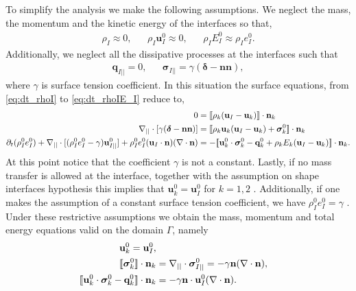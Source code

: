 To simplify the analysis we make the following assumptions. We neglect the mass, the momentum and the kinetic energy of the interfaces so that,
\begin{align*}
    \rho_I \approx 0,
    &&
    \rho_I \textbf{u}_I^0 \approx 0,
    &&
    \rho_I E_I^0 \approx \rho_I e_I^0. 
\end{align*}
Additionally, we neglect all the dissipative processes at the interfaces such that
\begin{align*}
    \textbf{q}_{I||} = 0,
    &&
    \bm\sigma_{I||} = \gamma (\bm\delta  - \textbf{nn}),
\end{align*}
where $\gamma$ is surface tension coefficient. 
In this situation the surface equations, from \ref{eq:dt_rhoI} to \ref{eq:dt_rhoIE_I} reduce to, 
\begin{align}
    0&= 
    \llbracket 
        \rho_k (\textbf{u}_I - \textbf{u}_k)
     \rrbracket \cdot \textbf{n}_k
    \\
    \mathbf{\nabla}_{||}\cdot [\gamma ( \bm\delta - \textbf{nn})]
    &= 
    \llbracket 
        \rho_k \textbf{u}_k (\textbf{u}_I - \textbf{u}_k)
        + \bm\sigma^0_k
     \rrbracket \cdot \textbf{n}_k
    \\
    \partial_t (\rho_I^0e_I^0)  
    + \mathbf{\nabla}_{||}\cdot [
        (\rho_I^0 e_I^0 - \gamma)
         \textbf{u}_{I||}^0
        ]
    + \rho_I^0e_I^0  (\textbf{u}_I \cdot \textbf{n})(\mathbf{\nabla}\cdot \textbf{n})
    &= 
    -\llbracket \textbf{u}_k^0 \cdot \bm{\sigma}_k^0 - \textbf{q}_k^0
    + \rho_k E_k (\textbf{u}_I - \textbf{u}_k)
     \rrbracket \cdot \textbf{n}_k. 
\end{align} 
At this point notice that the coefficient $\gamma$ is not a constant. 
Lastly, if no mass transfer is allowed at the interface, together with the assumption on shape interfaces hypothesis this implies that $\textbf{u}_k^0 = \textbf{u}_I^0$ for $k = 1,2$ \citep[chapter 2]{tryggvason2011direct}. 
Additionally, if one makes the assumption of a constant surface tension coefficient, we have $\rho_I^0 e_I^0 = \gamma$ \citep{ishii2010thermo}.  
Under these restrictive assumptions we obtain the mass, momentum and total energy equations valid on the domain $\Gamma$, namely
\begin{align}
    \label{eq:dt_rho_I}
    \textbf{u}_k^0 = \textbf{u}_I^0, \\
    \llbracket \bm{\sigma}_k^0 \rrbracket \cdot \textbf{n}_k 
    &=
    \mathbf{\nabla}_{||}\cdot\bm\sigma^0_{I||}
    =
    -\gamma\textbf{n}(\mathbf{\nabla}\cdot \textbf{n}),
    \label{eq:surface_tension}\\
    \label{eq:dt_rhoI_EI}
    \llbracket \textbf{u}_k^0 \cdot \bm{\sigma}_k^0 - \textbf{q}_k^0 \rrbracket \cdot \textbf{n}_k
    &=
    -\gamma\textbf{n}\cdot \textbf{u}_{I}^0(\mathbf{\nabla}\cdot \textbf{n}).
\end{align}
